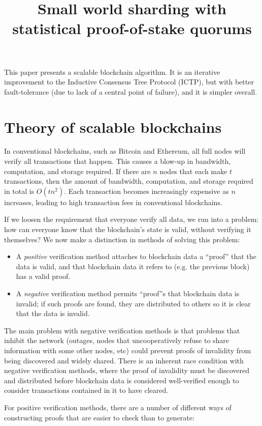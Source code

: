 \documentclass{article}
\begin{document}
\title{Small world sharding with statistical proof-of-stake quorums}

This paper presents a scalable blockchain algorithm.  It is an iterative improvement to the Inductive Consensus Tree Protocol (ICTP), but with better fault-tolerance (due to lack of a central point of failure), and it is simpler overall.

\section{Theory of scalable blockchains}

In conventional blockchains, such as Bitcoin and Ethereum, all full nodes will verify all transactions that happen.  This causes a blow-up in bandwidth, computation, and storage required.
If there are $n$ nodes that each make $t$ transactions, then the amount of bandwidth, computation, and storage required in total is $O(tn^2)$.  Each transaction becomes increasingly expensive
as $n$ increases, leading to high transaction fees in conventional blockchains.

If we loosen the requirement that everyone verify all data, we run into a problem: how can everyone know that the blockchain's state is valid, without verifying it themselves?
We now make a distinction in methods of solving this problem:

\begin{itemize}
  \item A \emph{positive} verification method attaches to blockchain data a ``proof'' that the data is valid, and that blockchain data it refers to (e.g. the previous block) has a valid proof.
  \item A \emph{negative} verification method permits ``proof''s that blockchain data is invalid; if such proofs are found, they are distributed to others so it is clear that the data is invalid.
\end{itemize}

The main problem with negative verification methods is that problems that inhibit the network (outages, nodes that uncooperatively refuse to share information with some other nodes, etc)
could prevent proofs of invalidity from being discovered and widely shared.  There is an inherent race condition with negative verification methods, where the proof of invalidity must be
discovered and distributed before blockchain data is considered well-verified enough to consider transactions contained in it to have cleared.

For positive verification methods, there are a number of different ways of constructing proofs that are easier to check than to generate:
\end{document}
